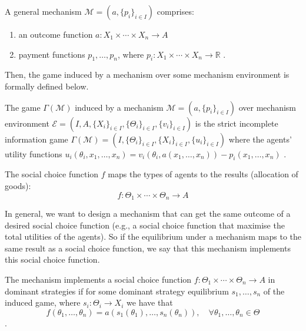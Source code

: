 \documentclass[11pt]{phdthesis}
\begin{document}
\begin{definition} [mechanism]\label{general mechanism}
	A general mechanism $ \mathcal{M} = (a, \{p_i\}_{i \in I}) $ comprises:
	\begin{enumerate}
		\item an outcome function $a : X_1 \times \cdots \times X_n \rightarrow A $
          \item payment functions $p_1,\ldots,p_n$, where $p_i : X_1 \times \cdots \times X_n \rightarrow \mathbb{R}$
          \citep[Definition 9.24]{nisan2007algorithmic}.
      \end{enumerate}
  \end{definition}

  Then, the game induced by a mechanism over some mechanism environment is formally defined below.
  \begin{definition}
      The game $ \Gamma(\mathcal{M}) $ induced by a mechanism $ \mathcal{M} = (a, \{p_i\}_{i \in I}) $ over mechanism environment $ \mathcal{E} = (I, A, \{X_i\}_{i \in I}, \{\Theta_{i}\}_{i \in I}, \{v_i\}_{i \in I}) $ is the strict incomplete information game $ \Gamma(\mathcal{M}) = (I, \{\Theta_{i}\}_{i \in I}, \{X_i\}_{i \in I}, \{u_i\}_{i \in I}) $ where the agents' utility functions $u_i(\theta_i,x_1,\ldots,x_n) = v_i(\theta_i,a(x_1,\ldots,x_n)) - p_i(x_1,\ldots,x_n)$
	\citep[Definition 9.24]{nisan2007algorithmic}.
\end{definition}

\begin{definition}
  The social choice function $f$ maps the types of agents to the results (allocation of goods):
	$$f : \Theta_1 \times \cdots \times \Theta_n \rightarrow A$$ 
  \label{social choice function}
\end{definition}

In general, we want to design a mechanism that can get the same outcome of a desired social choice function (e.g., a social choice function that maximise the total utilities of the agents). So if the equilibrium under a mechanism maps to the same result as a social choice function, we say that this mechanism implements this social choice function.

\begin{definition}[implementation]
	The mechanism implements a social choice function $f : \Theta_1 \times \cdots \times \Theta_n \rightarrow A$ in dominant strategies if for some dominant strategy equilibrium $s_1,\ldots,s_n$ of the induced game, where $s_i: \Theta_i \rightarrow X_i$ we have that
	$$ f(\theta_1,\ldots,\theta_n) = a(s_1(\theta_1),\ldots,s_n(\theta_n)), \quad \forall \theta_1,\ldots,\theta_n \in \Theta $$
	\citep[Definition 9.24]{nisan2007algorithmic}.
\end{definition}
\end{document}
